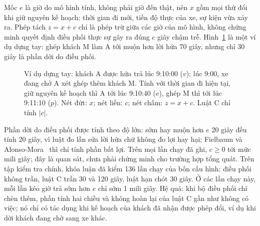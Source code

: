 Mốc $e$ là giờ do mô hình tính, không phải giờ đến thật, nên $x$ gồm mọi thứ đổi khi giữ nguyên kế hoạch: thời
gian đi mới, tiến độ thực của xe, sự kiện vừa xảy ra. Phép tách $z = x + c$ chỉ là phép trừ giữa các giờ của mô
hình, không chứng minh quyết định điều phối thực sự gây ra đúng $c$ giây chậm trễ. Hình~\ref{hinh:bamoc} là một ví
dụ dựng tay: ghép khách M làm A tới muộn hơn lời hứa 70 giây, nhưng chỉ 30 giây là phần dời do điều phối.

\begin{figure}[htbp]
\centering
{}
\caption[Ba mốc giờ trả trong một ví dụ dựng tay]{Ví dụ dựng tay: khách A được hứa trả lúc 9:10:00 ($v$); lúc 9:00, xe đang chở A xét ghép thêm khách M.
Tính với thời gian đi hiện tại, giữ nguyên kế hoạch thì A tới lúc 9:10:40 ($e$), ghép M thì tới lúc 9:11:10
($p$). Nét đứt: $x$; nét liền: $c$; nét chấm: $z = x + c$. Luật C chỉ tính $|c|$.}
\label{hinh:bamoc}
\end{figure}

Phần dời do điều phối được tính theo độ lớn: sớm hay muộn hơn $e$ 20 giây đều tính 20 giây, vì luật đo lần sửa
lời hứa chứ không đo lợi hay hại; Fielbaum và Alonso-Mora~\cite{fielbaum2020} thì chỉ tính phần bất lợi. Trên mọi
lần chạy đã ghi, $c \ge 0$ tới mức mili giây; đây là quan sát, chưa phải chứng minh cho trường hợp tổng quát. Trên
tập kiểm tra chính, khóa luận đã kiểm 136 lần chạy của bốn cấu hình: điều phối không trần, luật C trần 30 và 120
giây, luật hạn chót 30 giây. Ở các lần chạy này, mỗi lần kéo giờ trả sớm hơn $e$ chỉ sớm 1 mili giây. Hệ quả: khi
bộ điều phối chỉ chèn thêm, phần tính hai chiều và không hoàn lại của luật C gần như không có việc; nó chỉ có tác
dụng khi kế hoạch của khách đã nhận được phép đổi, ví dụ khi dời khách đang chờ sang xe khác.

